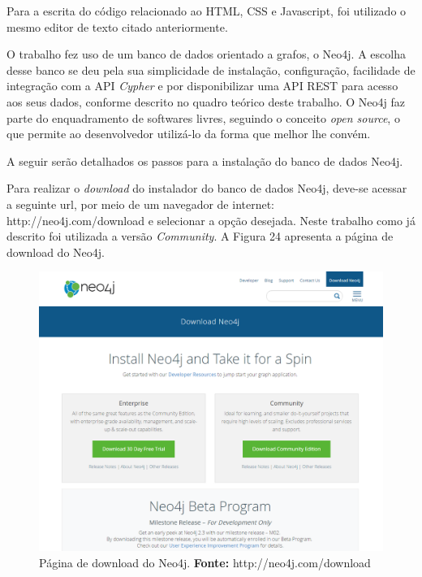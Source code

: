 \par Para a escrita do código relacionado ao HTML, CSS e Javascript, foi utilizado o mesmo editor de texto citado anteriormente.

\par O trabalho fez uso de um banco de dados orientado a grafos, o Neo4j. A escolha desse banco se deu pela sua simplicidade de instalação, configuração, facilidade de integração com a API \textit{Cypher} e por disponibilizar uma API REST para acesso aos seus dados, conforme descrito no quadro teórico deste trabalho. O Neo4j faz parte do enquadramento de softwares livres, seguindo o conceito \textit{open source}, o que permite ao desenvolvedor utilizá-lo da forma que melhor lhe convém. 


\par A seguir serão detalhados os passos para a instalação do banco de dados Neo4j.

\par Para realizar o \textit{download} do instalador do banco de dados Neo4j, deve-se acessar a seguinte url, por meio de um  navegador de internet: http://neo4j.com/download e selecionar a opção desejada. Neste trabalho como já descrito foi utilizada a versão \textit{Community}. A Figura 24 apresenta a página de download do Neo4j.

\newpage
\begin{figure}[h!]
	\centerline{\includegraphics[scale=0.4]{./imagens/download-neo4j.png}}
	\caption[Página de download do Neo4j]
	{Página de download do Neo4j. \textbf{Fonte:} http://neo4j.com/download}
	\label{fig:exemplo1}
\end{figure}


